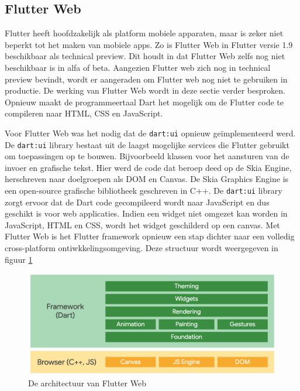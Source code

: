 
\subsection{Flutter Web}
Flutter heeft hoofdzakelijk als platform mobiele apparaten, maar is zeker niet beperkt tot het maken van mobiele apps. Zo is Flutter Web in Flutter versie 1.9 beschikbaar als technical preview. Dit houdt in dat Flutter Web zelfs nog niet beschikbaar is in alfa of beta. Aangezien Flutter web zich nog in technical preview bevindt, wordt er aangeraden om Flutter web nog niet te gebruiken in productie. De werking van Flutter Web wordt in deze sectie verder besproken.
\newline
Opnieuw maakt de programmeertaal Dart het mogelijk om de Flutter code te compileren naar HTML, CSS en JavaScript.

Voor Flutter Web was het nodig dat de \verb|dart:ui| opnieuw geïmplementeerd werd. De \verb|dart:ui| library bestaat uit de laagst mogelijke services die Flutter gebruikt om toepassingen op te bouwen. Bijvoorbeeld klassen voor het aansturen van de invoer en grafische tekst. Hier werd de code dat beroep deed op de Skia Engine, herschreven naar doelgroepen als DOM en Canvas. De Skia Graphics Engine is een open-source grafische bibliotheek geschreven in C++. De \verb|dart:ui| library zorgt ervoor dat de Dart code gecompileerd wordt naar JavaScript en dus geschikt is voor web applicaties. Indien een widget niet omgezet kan worden in JavaScript, HTML en CSS, wordt het widget geschilderd op een canvas.
\newline
Met Flutter Web is het Flutter framework opnieuw een stap dichter naar een volledig cross-platform ontiwkkelingsomgeving.
Deze structuur wordt weergegeven in figuur \ref{fig:flutter-web-architecture}
\begin{figure}[H]
    \includegraphics[width=\linewidth]{img/stand-van-zaken/flutter-web-architecture.png}
    \caption{De architectuur van Flutter Web \autocite{Flutter2019}}
    \label{fig:flutter-web-architecture}
\end{figure}


